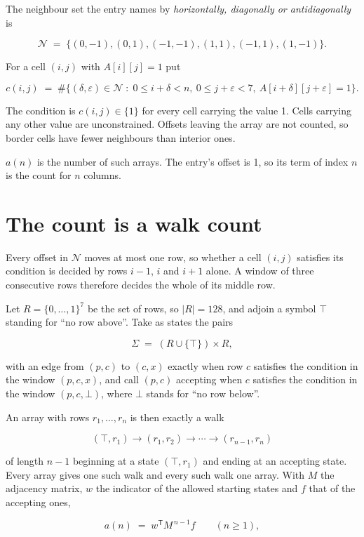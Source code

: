 \documentclass[11pt]{article}
\theoremstyle{definition}
\begin{document}
The neighbour set the entry names by {\itshape horizontally, diagonally or antidiagonally} is

\[\mathcal{N} \;=\; \{(0,-1), (0,1), (-1,-1), (1,1), (-1,1), (1,-1)\}.\]

For a cell $(i,j)$ with $A[i][j] = 1$ put

\[c(i,j) \;=\; \#\bigl\{(\delta,\varepsilon)\in\mathcal{N} \;:\; 0\le i+\delta<n,\ 0\le j+\varepsilon<7,\ A[i+\delta][j+\varepsilon] = 1\bigr\}.\]

The condition is $c(i,j) \in \{1\}$ for every cell carrying the value 1. Cells carrying any other value are unconstrained. Offsets leaving the array are not counted, so border cells have fewer neighbours than interior ones.

$a(n)$ is the number of such arrays. The entry's offset is 1, so its term of index $n$ is the count for $n$ columns.

\section{The count is a walk count}

Every offset in $\mathcal{N}$ moves at most one row, so whether a cell $(i,j)$ satisfies its condition is decided by rows $i-1$, $i$ and $i+1$ alone. A window of three consecutive rows therefore decides the whole of its middle row.

Let $R = \{0,\dots,1\}^{7}$ be the set of rows, so $|R| = 128$, and adjoin a symbol $\top$ standing for ``no row above''. Take as states the pairs

\[\Sigma \;=\; (R \cup \{\top\}) \times R,\]

with an edge from $(p,c)$ to $(c,x)$ exactly when row $c$ satisfies the condition in the window $(p,c,x)$, and call $(p,c)$ accepting when $c$ satisfies the condition in the window $(p,c,\bot)$, where $\bot$ stands for ``no row below''.

An array with rows $r_1,\dots,r_n$ is then exactly a walk

\[(\top,r_1) \to (r_1,r_2) \to \cdots \to (r_{n-1},r_n)\]

of length $n-1$ beginning at a state $(\top,r_1)$ and ending at an accepting state. Every array gives one such walk and every such walk one array. With $M$ the adjacency matrix, $w$ the indicator of the allowed starting states and $f$ that of the accepting ones,

\[a(n) \;=\; w^{\mathsf T} M^{\,n-1} f \qquad (n \ge 1),\]
\end{document}
